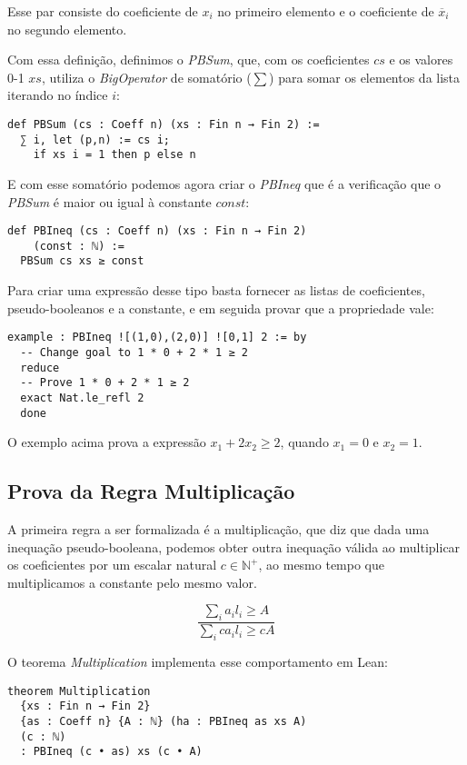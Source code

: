 \documentclass[conference]{IEEEtran}
\begin{document}
Esse par consiste do coeficiente de $x_i$ no primeiro elemento e
o coeficiente de $\overline x_i$ no segundo elemento.

Com essa definição, definimos o \textit{PBSum}, que, com os coeficientes $cs$ e os valores 0-1 $xs$,
utiliza o \textit{BigOperator} de somatório ($\sum$) para somar os elementos da lista iterando no índice $i$:
\begin{verbatim}
def PBSum (cs : Coeff n) (xs : Fin n → Fin 2) :=
  ∑ i, let (p,n) := cs i;
    if xs i = 1 then p else n
\end{verbatim}

E com esse somatório podemos agora criar o \textit{PBIneq} que é a verificação que o \textit{PBSum}
é maior ou igual à constante $const$:
\begin{verbatim}
def PBIneq (cs : Coeff n) (xs : Fin n → Fin 2)
    (const : ℕ) :=
  PBSum cs xs ≥ const
\end{verbatim}

Para criar uma expressão desse tipo basta fornecer as listas de coeficientes, pseudo-booleanos e a constante,
e em seguida provar que a propriedade vale:
\\
\begin{verbatim}
example : PBIneq ![(1,0),(2,0)] ![0,1] 2 := by
  -- Change goal to 1 * 0 + 2 * 1 ≥ 2
  reduce               
  -- Prove 1 * 0 + 2 * 1 ≥ 2
  exact Nat.le_refl 2  
  done
\end{verbatim}

O exemplo acima prova a expressão $x_1 + 2 x_2 \ge 2$, quando $x_1 = 0$ e $x_2 = 1$.


\subsection{Prova da Regra Multiplicação}
A primeira regra a ser formalizada é a multiplicação, que diz que dada uma inequação pseudo-booleana, podemos obter
outra inequação válida ao multiplicar os coeficientes por um escalar natural $c \in \mathbb{N}^+ $, ao mesmo tempo que multiplicamos
a constante pelo mesmo valor.

\begin{equation}
    \frac
    {\sum_i{a_i l_i} \ge A}
    {\sum_i{c a_i l_i} \ge c A}
\end{equation}

O teorema \textit{Multiplication} implementa esse comportamento em Lean:
\begin{verbatim}
theorem Multiplication
  {xs : Fin n → Fin 2}
  {as : Coeff n} {A : ℕ} (ha : PBIneq as xs A)
  (c : ℕ)
  : PBIneq (c • as) xs (c • A)
\end{verbatim}
\end{document}

